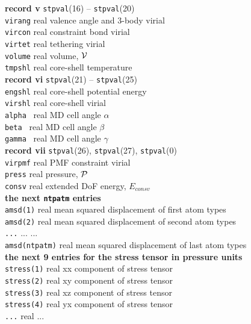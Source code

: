 \begin{tabbing}
{\bf record v} {\tt stpval}(16) -- {\tt stpval}(20) \\
\> {\tt virang} \> real    \> valence angle and 3-body virial \\
\> {\tt vircon} \> real    \> constraint bond virial \\
\> {\tt virtet} \> real    \> tethering virial \\
\> {\tt volume} \> real    \> volume, ${\cal V}$ \\
\> {\tt tmpshl} \> real    \> core-shell temperature \\
{\bf record vi} {\tt stpval}(21) -- {\tt stpval}(25) \\
\> {\tt engshl} \> real    \> core-shell potential energy \\
\> {\tt virshl} \> real    \> core-shell virial \\
\> {\tt alpha } \> real    \> MD cell angle $\alpha$ \\
\> {\tt beta }  \> real    \> MD cell angle $\beta$ \\
\> {\tt gamma } \> real    \> MD cell angle $\gamma$ \\
{\bf record vii} {\tt stpval}(26), {\tt stpval}(27), {\tt stpval}(0) \\
\> {\tt virpmf} \> real    \> PMF constraint virial \\
\> {\tt press}  \> real    \> pressure, ${\cal P}$ \\
\> {\tt consv}  \> real    \> extended DoF energy, $E_{consv}$ \\
{\bf the next {\tt ntpatm} entries} \\
\> {\tt amsd(1)} \> real   \> mean squared displacement of first atom types \\
\> {\tt amsd(2)} \> real   \> mean squared displacement of second atom types \\
\> {\tt ...} \> ... \> ... \\
\> {\tt amsd(ntpatm)} \> real \> mean squared displacement of last atom types \\
{\bf the next 9 entries for the stress tensor in pressure units} \\
\> {\tt stress(1)} \> real \> xx component of stress tensor \\
\> {\tt stress(2)} \> real \> xy component of stress tensor \\
\> {\tt stress(3)} \> real \> xz component of stress tensor \\
\> {\tt stress(4)} \> real \> yx component of stress tensor \\
\> {\tt ...} \> real \> ... \\

\end{tabbing}
